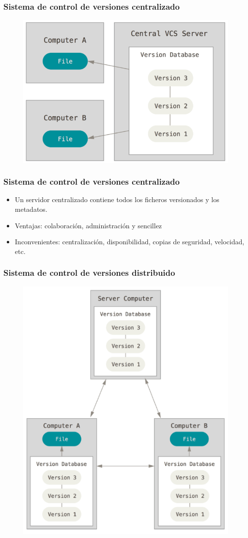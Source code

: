 \documentclass{beamer}
\begin{document}
\begin{frame}
\frametitle{Sistema de control de versiones centralizado}
\begin{figure}
\includegraphics[width=0.50\linewidth]{img/centralized.png}
\end{figure}
\end{frame}

\begin{frame}
\frametitle{Sistema de control de versiones centralizado}
\begin{itemize}
\item Un servidor centralizado contiene todos los ficheros versionados y los metadatos.
\item Ventajas: colaboración, administración y sencillez
\item Inconvenientes: centralización, disponibilidad, copias de seguridad, velocidad, etc.
\end{itemize}
\end{frame}

\begin{frame}
\frametitle{Sistema de control de versiones distribuido}
\begin{figure}
\includegraphics[width=0.50\linewidth]{img/distributed.png}
\end{figure}
\end{frame}
\end{document}

